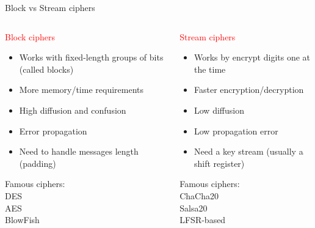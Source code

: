 \begin{frame}{Block vs Stream ciphers}

  \begin{columns}
  \begin{column}{0.5\textwidth}
    \textcolor{red}{Block ciphers}
    
    \begin{itemize}
      \item Works with fixed-length groups of bits (called blocks)
      \item More memory/time requirements
      \item High diffusion and confusion
      \item Error propagation
      \item Need to handle messages length (padding)
    \end{itemize}

    Famous ciphers:       \\
    \phantom{pad}DES      \\
    \phantom{pad}AES      \\
    \phantom{pad}BlowFish
  \end{column}
  \begin{column}{0.5\textwidth}
    \textcolor{red}{Stream ciphers}
    
    \begin{itemize}
      \item Works by encrypt digits one at the time
      \item Faster encryption/decryption
      \item Low diffusion
      \item Low propagation error
      \item Need a key stream (usually a shift register)
    \end{itemize}

    Famous ciphers:         \\
    \phantom{pad}ChaCha20   \\
    \phantom{pad}Salsa20    \\
    \phantom{pad}LFSR-based
    
  \end{column}
  \end{columns}

\end{frame}


